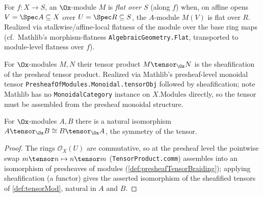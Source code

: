 \begin{definition}

  \label{def:isSFlat}
  For $f : X \to S$, an $\Ox$-module $M$ is \emph{flat over $S$} (along $f$) when,
  on affine opens $V = \Spec A \subseteq X$ over $U = \Spec R \subseteq S$, the
  $A$-module $M(V)$ is flat over $R$. Realized via stalkwise/affine-local flatness
  of the module over the base ring maps (cf.\ Mathlib's morphism-flatness
  \texttt{AlgebraicGeometry.Flat}, transported to module-level flatness over $f$).
\end{definition}

\begin{definition}

  \label{def:tensorMod}
  For $\Ox$-modules $M, N$ their tensor product $M \tensor_{\Ox} N$ is the
  sheafification of the presheaf tensor product. Realized via Mathlib's
  presheaf-level monoidal tensor \texttt{PresheafOfModules.Monoidal.tensorObj}
  followed by sheafification; note Mathlib has no \texttt{MonoidalCategory}
  instance on $X.\mathrm{Modules}$ directly, so the tensor must be assembled
  from the presheaf monoidal structure.
\end{definition}


\begin{lemma}
  \label{lem:tensorMod_braiding}
  For $\Ox$-modules $A, B$ there is a natural isomorphism
  $A \tensor_{\Ox} B \cong B \tensor_{\Ox} A$, the symmetry of the tensor.
  \begin{proof}
    The rings $\mathcal{O}_X(U)$ are commutative, so at the presheaf level the
    pointwise swap $m \tensor n \mapsto n \tensor m$ (\texttt{TensorProduct.comm})
    assembles into an isomorphism of presheaves of modules
    (\cref{def:presheafTensorBraiding}); applying sheafification (a functor) gives
    the asserted isomorphism of the sheafified tensors of \cref{def:tensorMod},
    natural in $A$ and $B$.
  \end{proof}
\end{lemma}

